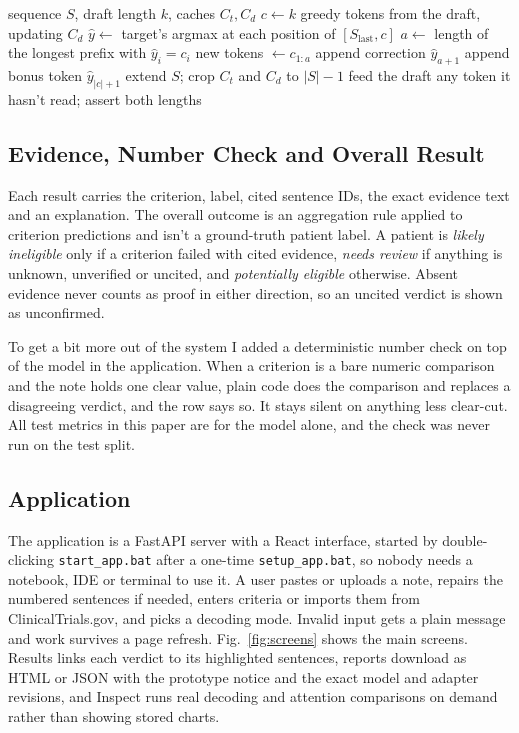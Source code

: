 \documentclass[conference]{IEEEtran}
\begin{document}
\begin{algorithm}[t]
\caption{One round of greedy speculative decoding}
\label{alg:spec}
\footnotesize
\begin{algorithmic}[1]
\Require sequence $S$, draft length $k$, caches $C_t, C_d$
\State $c \gets k$ greedy tokens from the draft, updating $C_d$
\State $\hat{y} \gets$ target's argmax at each position of $[S_{\text{last}}, c]$
\State $a \gets$ length of the longest prefix with $\hat{y}_i = c_i$
\State new tokens $\gets c_{1:a}$
 append correction $\hat{y}_{a+1}$
\Else{} append bonus token $\hat{y}_{|c|+1}$
\EndIf
\State extend $S$; crop $C_t$ and $C_d$ to $|S|-1$
\State feed the draft any token it hasn't read; assert both lengths
\end{algorithmic}
\end{algorithm}

\subsection{Evidence, Number Check and Overall Result}

Each result carries the criterion, label, cited sentence IDs, the exact evidence text and an explanation. The overall outcome is an aggregation rule applied to criterion predictions and isn't a ground-truth patient label. A patient is \emph{likely ineligible} only if a criterion failed with cited evidence, \emph{needs review} if anything is unknown, unverified or uncited, and \emph{potentially eligible} otherwise. Absent evidence never counts as proof in either direction, so an uncited verdict is shown as unconfirmed.

To get a bit more out of the system I added a deterministic number check on top of the model in the application. When a criterion is a bare numeric comparison and the note holds one clear value, plain code does the comparison and replaces a disagreeing verdict, and the row says so. It stays silent on anything less clear-cut. All test metrics in this paper are for the model alone, and the check was never run on the test split.

\subsection{Application}

The application is a FastAPI server with a React interface, started by double-clicking \texttt{start\_app.bat} after a one-time \texttt{setup\_app.bat}, so nobody needs a notebook, IDE or terminal to use it. A user pastes or uploads a note, repairs the numbered sentences if needed, enters criteria or imports them from ClinicalTrials.gov, and picks a decoding mode. Invalid input gets a plain message and work survives a page refresh. Fig.~\ref{fig:screens} shows the main screens. Results links each verdict to its highlighted sentences, reports download as HTML or JSON with the prototype notice and the exact model and adapter revisions, and Inspect runs real decoding and attention comparisons on demand rather than showing stored charts.
\end{document}
